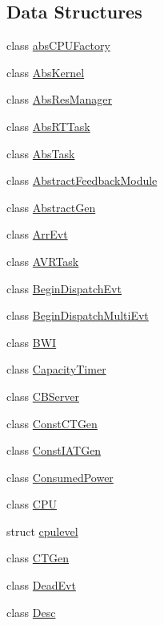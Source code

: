 \subsection*{Data Structures}
\begin{DoxyCompactItemize}
\item 
class \hyperlink{classRTSim_1_1absCPUFactory}{abs\+C\+P\+U\+Factory}
\item 
class \hyperlink{classRTSim_1_1AbsKernel}{Abs\+Kernel}
\item 
class \hyperlink{classRTSim_1_1AbsResManager}{Abs\+Res\+Manager}
\item 
class \hyperlink{classRTSim_1_1AbsRTTask}{Abs\+R\+T\+Task}
\item 
class \hyperlink{classRTSim_1_1AbsTask}{Abs\+Task}
\item 
class \hyperlink{classRTSim_1_1AbstractFeedbackModule}{Abstract\+Feedback\+Module}
\item 
class \hyperlink{classRTSim_1_1AbstractGen}{Abstract\+Gen}
\item 
class \hyperlink{classRTSim_1_1ArrEvt}{Arr\+Evt}
\item 
class \hyperlink{classRTSim_1_1AVRTask}{A\+V\+R\+Task}
\item 
class \hyperlink{classRTSim_1_1BeginDispatchEvt}{Begin\+Dispatch\+Evt}
\item 
class \hyperlink{classRTSim_1_1BeginDispatchMultiEvt}{Begin\+Dispatch\+Multi\+Evt}
\item 
class \hyperlink{classRTSim_1_1BWI}{B\+WI}
\item 
class \hyperlink{classRTSim_1_1CapacityTimer}{Capacity\+Timer}
\item 
class \hyperlink{classRTSim_1_1CBServer}{C\+B\+Server}
\item 
class \hyperlink{classRTSim_1_1ConstCTGen}{Const\+C\+T\+Gen}
\item 
class \hyperlink{classRTSim_1_1ConstIATGen}{Const\+I\+A\+T\+Gen}
\item 
class \hyperlink{classRTSim_1_1ConsumedPower}{Consumed\+Power}
\item 
class \hyperlink{classRTSim_1_1CPU}{C\+PU}
\item 
struct \hyperlink{structRTSim_1_1cpulevel}{cpulevel}
\item 
class \hyperlink{classRTSim_1_1CTGen}{C\+T\+Gen}
\item 
class \hyperlink{classRTSim_1_1DeadEvt}{Dead\+Evt}
\item 
class \hyperlink{classRTSim_1_1Desc}{Desc}
\item 

\end{DoxyCompactItemize}
